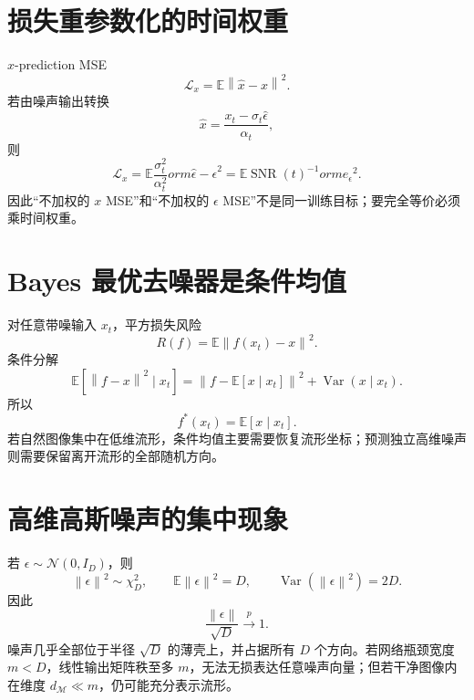 \documentclass[UTF8,12pt,a4paper,fontset=none]{ctexart}
\numberwithin{equation}{section}
\newcommand{\E}{\mathbb{E}}
\newcommand{\Loss}{\mathcal{L}}
\newcommand{\norm}[1]{\left\lVert #1\right\rVert}
\begin{document}
\section{损失重参数化的时间权重}
$x$-prediction MSE
\begin{equation}
 \Loss_x=\E\norm{\widehat x-x}^2.
\end{equation}
若由噪声输出转换
\begin{equation}
 \widehat x=\frac{x_t-\sigma_t\widehat\epsilon}{\alpha_t},
\end{equation}
则
\begin{equation}
 \Loss_x
 =\E\frac{\sigma_t^2}{\alpha_t^2}
orm{\widehat\epsilon-\epsilon}^2
 =\E\operatorname{SNR}(t)^{-1}
orm{e_\epsilon}^2.
\end{equation}
因此“不加权的 $x$ MSE”和“不加权的 $\epsilon$ MSE”不是同一训练目标；要完全等价必须乘时间权重。

\section{Bayes 最优去噪器是条件均值}
对任意带噪输入 $x_t$，平方损失风险
\begin{equation}
 R(f)=\E\norm{f(x_t)-x}^2.
\end{equation}
条件分解
\begin{equation}
 \E[\norm{f-x}^2\mid x_t]
 =\norm{f-\E[x\mid x_t]}^2+\operatorname{Var}(x\mid x_t).
\end{equation}
所以
\begin{equation}
 \boxed{f^*(x_t)=\E[x\mid x_t].}
\end{equation}
若自然图像集中在低维流形，条件均值主要需要恢复流形坐标；预测独立高维噪声则需要保留离开流形的全部随机方向。

\section{高维高斯噪声的集中现象}
若 $\epsilon\sim\mathcal N(0,I_D)$，则
\begin{equation}
 \norm{\epsilon}^2\sim\chi_D^2,
 \qquad \E\norm{\epsilon}^2=D,
 \qquad \operatorname{Var}(\norm{\epsilon}^2)=2D.
\end{equation}
因此
\begin{equation}
 \frac{\norm{\epsilon}}{\sqrt D}\xrightarrow{p}1.
\end{equation}
噪声几乎全部位于半径 $\sqrt D$ 的薄壳上，并占据所有 $D$ 个方向。若网络瓶颈宽度 $m<D$，线性输出矩阵秩至多 $m$，无法无损表达任意噪声向量；但若干净图像内在维度 $d_\mathcal M\ll m$，仍可能充分表示流形。
\end{document}
